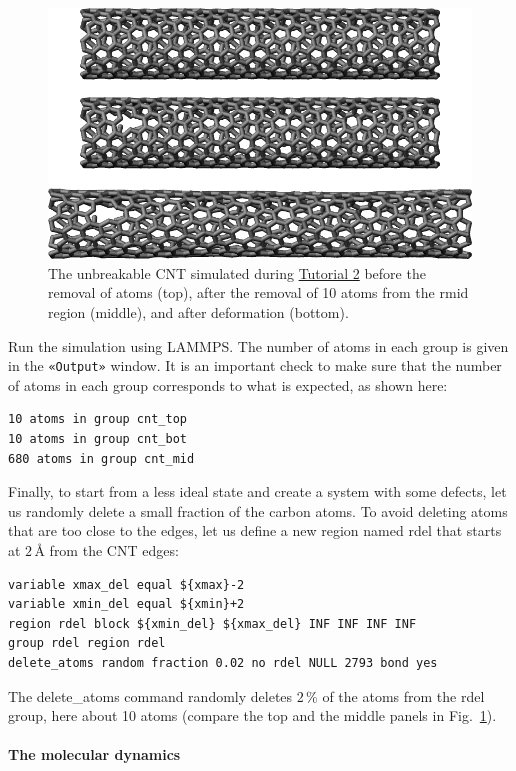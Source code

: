 \documentclass[9pt,tutorial]{livecoms}
\newcommand{\lmpcmd}[1]{\hspace{0pt}\colorbox{listing}{\textcolor{command}{\small{#1}}}\hspace{0pt}} %
\newcommand{\guicmd}[1]{\textcolor{command}{\texttt{«#1»}}} %
\begin{document}
\begin{figure}
\centering
\includegraphics[width=\linewidth]{CNT-unbreakable}
\caption{The unbreakable CNT simulated during \hyperref[carbon-nanotube-label]{Tutorial 2}
before the removal of atoms (top), after the removal of 10 atoms from the \lmpcmd{rmid}
region (middle), and after deformation (bottom).}
\label{fig:CNT-unbreakable}
\end{figure}

Run the simulation using LAMMPS.  The number of atoms in each group is given in
the \guicmd{Output} window.  It is an important check to make sure that the number
of atoms in each group corresponds to what is expected, as shown here:
\begin{lstlisting}
10 atoms in group cnt_top
10 atoms in group cnt_bot
680 atoms in group cnt_mid
\end{lstlisting}

Finally, to start from a less ideal state and create a system with some defects,
let us randomly delete a small fraction of the carbon atoms.  To avoid deleting
atoms that are too close to the edges, let us define a new region named \lmpcmd{rdel}
that starts at $2\,\text{\AA{}}$ from the CNT edges:
\begin{lstlisting}
variable xmax_del equal ${xmax}-2
variable xmin_del equal ${xmin}+2
region rdel block ${xmin_del} ${xmax_del} INF INF INF INF
group rdel region rdel
delete_atoms random fraction 0.02 no rdel NULL 2793 bond yes
\end{lstlisting}
The \lmpcmd{delete\_atoms} command randomly deletes $2\,\%$ of the atoms from
the \lmpcmd{rdel} group, here about 10 atoms (compare the top
and the middle panels in Fig.~\ref{fig:CNT-unbreakable}).

\paragraph{The molecular dynamics}
\end{document}
